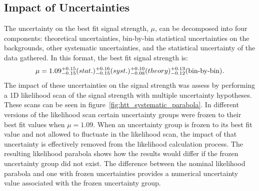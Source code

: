 %
%


\subsection{Impact of Uncertainties}
The uncertainty on the best fit signal strength, $\mu$, can be decomposed into four components: theoretical uncertainties, 
bin-by-bin statistical uncertainties on the backgrounds, other systematic uncertainties, and the statistical 
uncertainty of the data gathered. In this format, the best fit signal strength is:
\[ \mu = 1.09^{+0.15}_{-0.15}(stat.){}^{+0.16}_{-0.15}(syst.){}^{+0.10}_{-0.08}(theory){}^{+0.13}_{-0.12} \text{(bin-by-bin).}\]
The impact of these uncertainties on the signal strength was assess by performing a 1D likelihood scan of 
the signal strength with multiple uncertainty hypotheses. These scans can be seen in 
figure~\ref{fig:htt_systematic_parabola}. In different versions of the likelihood scan
certain uncertainty groups were frozen to their best fit values when $\mu = 1.09$. When an uncertainty group is frozen to
its best fit value and not allowed to fluctuate in the likelihood scan, the impact of that uncertainty is
effectively removed from the likelihood calculation process. The resulting likelihood parabola shows how
the results would differ if the frozen uncertainty group did not exist. The difference between the nominal
likelihood parabola and one with frozen uncertainties provides a numerical uncertainty value associated with
the frozen uncertainty group.



